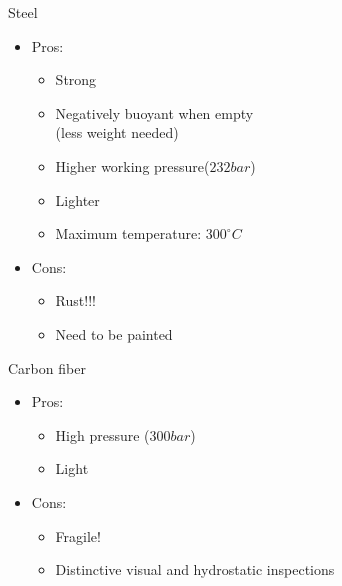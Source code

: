 \documentclass[aspectratio=1610,english,12pt]{beamer}
\begin{document}
\begin{frame}{Steel}
	\begin{itemize}
		\item Pros:
			\begin{itemize}
				\item Strong
				\item Negatively buoyant when empty\\(less weight needed)
				\item Higher working pressure($232bar$)
				\item Lighter
				\item Maximum temperature: $300^\circ C$
			\end{itemize}
		\item Cons:
			\begin{itemize}
				\item Rust!!!
				\item Need to be painted
			\end{itemize}
	\end{itemize}
\end{frame}

\begin{frame}{Carbon fiber}
	\begin{itemize}
		\item Pros:
			\begin{itemize}
				\item High pressure ($300bar$)
				\item Light
			\end{itemize}
		\item Cons:
			\begin{itemize}
				\item Fragile!
				\item Distinctive visual and hydrostatic inspections 
			\end{itemize}
	\end{itemize}
\end{frame}

\end{document}
